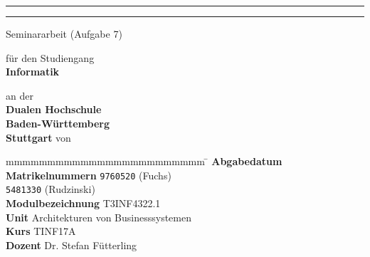 \hfill
{}

\vfill\vfill

\begin{center}
	\rule{\linewidth}{1pt}
	{
		\Huge \bfseries
			\@title
		\par	
	}
	\vspace{-0.2cm}
	\rule{\linewidth}{1pt}
	

	Seminararbeit (Aufgabe 7)
	\vfill
	
	für den Studiengang \\ \textbf{Informatik}
	
	an der \\ \textbf{Dualen Hochschule \\Baden-Württemberg\\Stuttgart}
	\vfill
	von \\ \textbf{\textsc{\@author}}
\end{center}

\vfill\vfill

\begin{tabbing}
	mmmmmmmmmmmmmmmmmmmmmmmm				\= \kill
	\textbf{Abgabedatum} \> \@date \\
	\textbf{Matrikelnummern} \> \texttt{9760520} (Fuchs)\\
	\> \texttt{5481330} (Rudzinski) \\
	\textbf{Modulbezeichnung} \> T3INF4322.1 \\
	\textbf{Unit} \> Architekturen von Businesssystemen \\
	\textbf{Kurs}	\> TINF17A \\
	\textbf{Dozent} \> Dr. Stefan Fütterling \\ 
\end{tabbing}